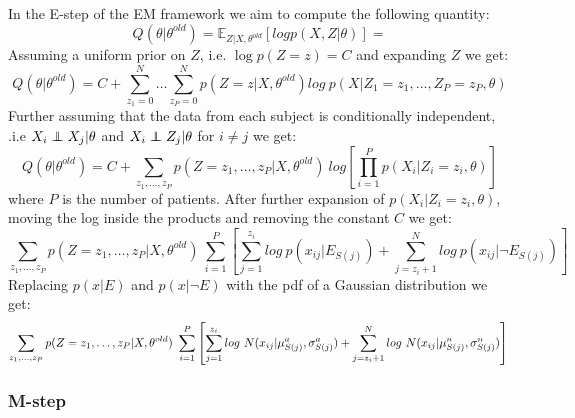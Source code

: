 In the E-step of the EM framework we aim to compute the following quantity:
$$Q(\theta | \theta^{old}) = \mathbb{E}_{Z|X,\theta^{old}}[log p(X,Z|\theta)] = $$
Assuming a uniform prior on $Z$, i.e. $\log p(Z = z) = C$ and expanding $Z$ we get: 
$$ Q(\theta | \theta^{old}) = C + \sum_{z_1 = 0}^N \dots \sum_{z_P = 0}^N p(Z = z|X, \theta^{old}) log\ p(X|Z_1 = z_1, \dots, Z_P = z_P, \theta)$$
Further assuming that the data from each subject is conditionally independent, .i.e $X_i \independent X_j|\theta$ and $X_i \independent Z_j|\theta$ for $i \neq j$ we get:
$$ Q(\theta | \theta^{old}) = C + \sum_{z_1, \dots, z_P}  p(Z = z_1, \dots, z_P |X, \theta^{old})\ log\left[ \prod_{i=1}^{P} p(X_i|Z_i = z_i, \theta) \right]$$
where $P$ is the number of patients. After further expansion of $p(X_i|Z_i = z_i, \theta)$, moving the log inside the products and removing the constant $C$ we get:
$$ \sum_{z_1, \dots, z_P}  p(Z = z_1, \dots, z_P |X, \theta^{old})\ \sum_{i=1}^{P} \left[ \sum_{j=1}^{z_i} log\ p(x_{ij}|E_{S(j)}) + \sum_{j=z_i + 1}^N log\ p(x_{ij}| \neg E_{S(j)}) \right]$$
Replacing $p(x|E)$ and $p(x|\neg E)$ with the pdf of a Gaussian distribution we get:
\begin{equation} 
\label{eq:eStep}
\sum_{z_1, \dots, z_P}  p(Z = z_1, \dots, z_P |X, \theta^{old})\ \sum_{i=1}^{P} \left[ \sum_{j=1}^{z_i} log\ N(x_{ij}|\mu_{S(j)}^a, \sigma_{S(j)}^a) + \sum_{j=z_i + 1}^N log\ N(x_{ij}|\mu_{S(j)}^n, \sigma_{S(j)}^n) \right] \\
\end{equation}

\subsubsection{M-step}

